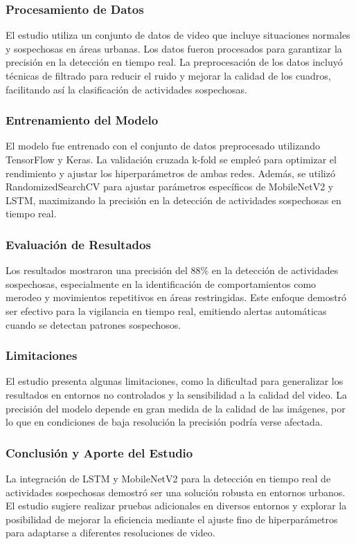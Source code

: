 \clearpage

\subsubsection{Procesamiento de Datos}
El estudio utiliza un conjunto de datos de video que incluye situaciones normales y sospechosas en áreas urbanas. Los datos fueron procesados para garantizar la precisión en la detección en tiempo real. La preprocesación de los datos incluyó técnicas de filtrado para reducir el ruido y mejorar la calidad de los cuadros, facilitando así la clasificación de actividades sospechosas.

\subsubsection{Entrenamiento del Modelo}
El modelo fue entrenado con el conjunto de datos preprocesado utilizando TensorFlow y Keras. La validación cruzada k-fold se empleó para optimizar el rendimiento y ajustar los hiperparámetros de ambas redes. Además, se utilizó RandomizedSearchCV para ajustar parámetros específicos de MobileNetV2 y LSTM, maximizando la precisión en la detección de actividades sospechosas en tiempo real.

\subsubsection{Evaluación de Resultados}
Los resultados mostraron una precisión del 88\% en la detección de actividades sospechosas, especialmente en la identificación de comportamientos como merodeo y movimientos repetitivos en áreas restringidas. Este enfoque demostró ser efectivo para la vigilancia en tiempo real, emitiendo alertas automáticas cuando se detectan patrones sospechosos.

\subsubsection{Limitaciones}
El estudio presenta algunas limitaciones, como la dificultad para generalizar los resultados en entornos no controlados y la sensibilidad a la calidad del video. La precisión del modelo depende en gran medida de la calidad de las imágenes, por lo que en condiciones de baja resolución la precisión podría verse afectada.

\subsubsection{Conclusión y Aporte del Estudio}
La integración de LSTM y MobileNetV2 para la detección en tiempo real de actividades sospechosas demostró ser una solución robusta en entornos urbanos. El estudio sugiere realizar pruebas adicionales en diversos entornos y explorar la posibilidad de mejorar la eficiencia mediante el ajuste fino de hiperparámetros para adaptarse a diferentes resoluciones de video.








